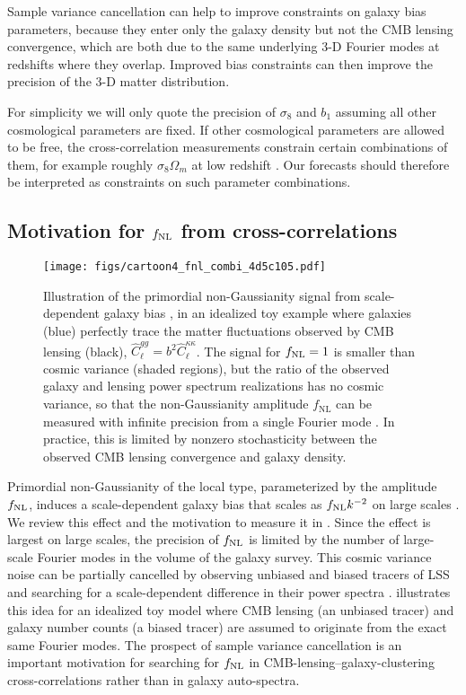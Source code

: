 \documentclass[prd,superscriptaddress,floatfix,notitlepage,nofootinbib,reprint]{revtex4-1} %
\begin{document}
Sample variance cancellation can help to improve constraints on galaxy bias parameters, because they enter only the galaxy density but not the CMB lensing convergence, which are both due to the same underlying 3-D Fourier modes at redshifts where they overlap.
Improved bias constraints can then improve the precision of the 3-D matter distribution.


For simplicity we will only quote the precision of $\sigma_8$ and $b_1$ assuming all other cosmological parameters are fixed.
If other cosmological parameters are allowed to be free, the cross-correlation measurements constrain certain combinations of them, for example roughly $\sigma_8\Omega_m$ at low redshift \cite{Jain:1996st}.
Our forecasts should therefore be interpreted as constraints on such parameter combinations.


\subsection{Motivation for \texorpdfstring{${f_\mathrm{NL}}$}{fNL} from cross-correlations}


\begin{figure}[tbp]
\texttt{[image: figs/cartoon4\_fnl\_combi\_4d5c105.pdf]}
\caption{Illustration of the primordial non-Gaussianity signal from scale-dependent galaxy bias \cite{Dalal0710}, in an idealized toy example where galaxies (blue) perfectly trace the matter fluctuations observed by CMB lensing (black), $\hat C_\ell^{gg}= b^2 \hat C_\ell^{\kappa\kappa}$.
The signal for ${f_\mathrm{NL}}=1$ is smaller than cosmic variance (shaded regions), but the ratio of the observed galaxy and lensing power spectrum realizations has no cosmic variance, so that the non-Gaussianity amplitude $f_\mathrm{NL}$ can be measured with infinite precision from a single Fourier mode  \cite{Uros0807}.
In practice, this is limited by nonzero stochasticity between the observed CMB lensing convergence and galaxy density.
}
\label{fig:fnlcartoon}
\end{figure}


Primordial non-Gaussianity of the local type, parameterized by the amplitude ${f_\mathrm{NL}}$, induces a scale-dependent galaxy bias that scales as ${f_\mathrm{NL}} k^{-2}$ on large scales \cite{Dalal0710}.
We review this effect and the motivation to measure it in .
Since the effect is largest on large scales, the precision of ${f_\mathrm{NL}}$
is limited by the number of large-scale Fourier modes in the volume of the galaxy survey.
This cosmic variance noise can be partially cancelled by observing unbiased and biased tracers of LSS and searching for a scale-dependent difference in their power spectra \cite{Uros0807}. 
 illustrates this idea for an idealized toy model where CMB lensing (an unbiased tracer) and galaxy number counts (a biased tracer) are assumed to originate from the exact same Fourier modes.
The prospect of sample variance cancellation is an important motivation for searching for ${f_\mathrm{NL}}$ in CMB-lensing--galaxy-clustering cross-correlations rather than in galaxy auto-spectra.
\end{document}
